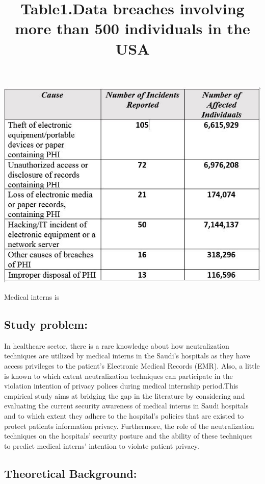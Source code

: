 \begin{center}
	\title{Table1.Data breaches involving more than 500 individuals in the USA \cite{OfficeofCivilRights2014} }
	\includegraphics [scale=1]{Data_Breach_table_2013_2014.JPG}
\end{center}

Medical interns is 

 \subsection{Study problem:}
In healthcare sector, there is a rare knowledge about how neutralization techniques are utilized by medical interns in the Saudi's hospitals as they have access privileges to the patient's Electronic Medical Records (EMR). Also, a little is known to which extent neutralization techniques can participate in the violation intention of privacy polices during medical internship period.This empirical study aims at bridging the gap in the literature by considering and evaluating the current security awareness of medical interns in Saudi hospitals and to which extent they adhere to the hospital's policies that are existed to protect patients information privacy. Furthermore, the role of the neutralization techniques on the hospitals' security posture and the ability of these techniques to predict medical interns' intention to violate patient privacy.
\subsection{Theoretical Background:}
